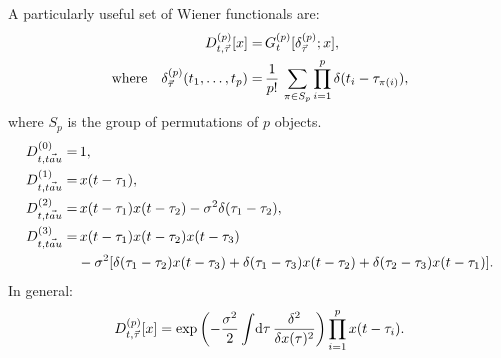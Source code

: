 \documentclass[12pt]{article}
\theoremstyle{slplain}
\theoremstyle{sldefinition}
\theoremstyle{remark}
\begin{document}
A particularly useful set of Wiener functionals are:
%
\begin{equation}\label{eq:wienerdelta}
  \begin{aligned}
    D^{(p)}_{t,\vec{\tau}}[x] =& \, G^{(p)}_t[\delta^{(p)}_{\vec{\tau}};x], \\ \text{where}\quad
    \delta^{(p)}_{\vec{\tau}}(t_1,\ldots,t_p) =& \, \frac{1}{p!}\,\sum_{\pi\in S_p} \prod_{i=1}^p \delta(t_i-\tau_{\pi(i)}),
  \end{aligned}
\end{equation}
%
where $S_p$ is the group of permutations of $p$ objects. 
\eg
%
\begin{equation}\label{eq:wienerdeltaex}
  \begin{aligned}
    D^{(0)}_{t,\vec{tau}} =&\, 1, \\
    D^{(1)}_{t,\vec{tau}} =&\, x(t-\tau_1), \\
    D^{(2)}_{t,\vec{tau}} =&\, x(t-\tau_1)x(t-\tau_2)-\sigma^2\delta(\tau_1-\tau_2), \\
    D^{(3)}_{t,\vec{tau}} =&\, x(t-\tau_1)x(t-\tau_2)x(t-\tau_3)\\& - \sigma^2 [\delta(\tau_1-\tau_2)x(t-\tau_3) + \delta(\tau_1-\tau_3)x(t-\tau_2) + \delta(\tau_2-\tau_3)x(t-\tau_1) ]. \\
  \end{aligned}
\end{equation}
%
In general:
%
\begin{equation}\label{eq:wienerdeltagen}
  D^{(p)}_{t,\vec{\tau}}[x] = \exp\left ( -\frac{\sigma^2}{2}\int\!\mathrm{d} \tau\,\frac{\delta ^2}{\delta x(\tau)^2} \right ) \prod_{i=1}^p x(t-\tau_i).
\end{equation}
%
\end{document}
